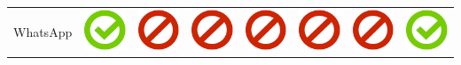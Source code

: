 \documentclass[10pt,foldmark,tumble]{leaflet}
\begin{document}
{\begin{tabular}{ L{2cm} | C{2cm} | C{2cm} | C{2cm} | C{2cm} | C{2cm} | C{2cm} | C{2cm} | }
WhatsApp & \includegraphics[scale=0.1]{pics/haken.png} & \includegraphics[scale=0.1]{pics/nohaken.png} & \includegraphics[scale=0.1]{pics/nohaken.png} & \includegraphics[scale=0.1]{pics/nohaken.png} & \includegraphics[scale=0.1]{pics/nohaken.png} & \includegraphics[scale=0.1]{pics/nohaken.png} & \includegraphics[scale=0.1]{pics/haken.png} \tabularnewline

\end{tabular}}
\end{document}
